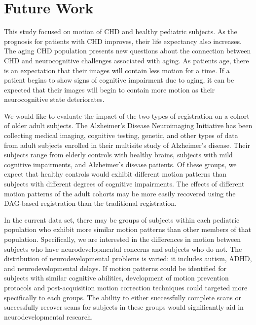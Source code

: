 \section{Future Work}

This study focused on motion of CHD and healthy pediatric subjects. As the prognosis for patients with CHD improves, their life expectancy also increases. The aging CHD population presents new questions about the connection between CHD and neurocognitive challenges associated with aging. As patients age, there is an expectation that their images will contain less motion for a time. If a patient begins to show signs of cognitive impairment due to aging, it can be expected that their images will begin to contain more motion as their neurocognitive state deteriorates. 

We would like to evaluate the impact of the two types of registration on a cohort of older adult subjects. The Alzheimer's Disease Neuroimaging Initiative has been collecting medical imaging, cognitive testing, genetic, and other types of data from adult subjects enrolled in their multisite study of Alzheimer's disease. Their subjects range from elderly controls with healthy brains, subjects with mild cognitive impairments, and Alzheimer's disease patients. Of these groups, we expect that healthy controls would exhibit different motion patterns than subjects with different degrees of cognitive impairments. The effects of different motion patterns of the adult cohorts may be more easily recovered using the DAG-based registration than the traditional registration.

In the current data set, there may be groups of subjects within each pediatric population who exhibit more similar motion patterns than other members of that population. Specifically, we are interested in the differences in motion between subjects who have neurodevelopmental concerns and subjects who do not. The distribution of neurodevelopmental problems is varied: it includes autism, ADHD, and neurodevelopmental delays. If motion patterns could be identified for subjects with similar cognitive abilities, development of motion prevention protocols and post-acquisition motion correction techniques could targeted more specifically to each groups. The ability to either successfully complete scans or successfully recover scans for subjects in these groups would significantly aid in neurodevelopmental research.
